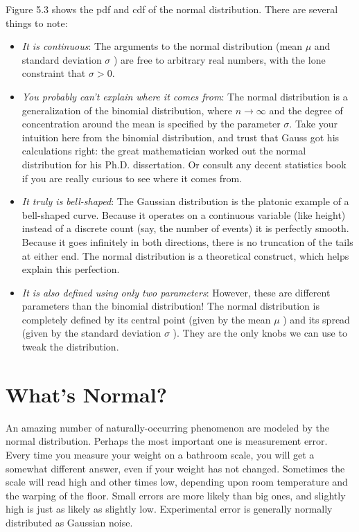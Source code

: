 \documentclass[10pt]{article}
\begin{document}
Figure 5.3 shows the pdf and cdf of the normal distribution. There are several things to note:
\begin{itemize}
  \item \emph{It is continuous}: The arguments to the normal distribution (mean $\mu$ and standard deviation $\sigma$ ) are free to arbitrary real numbers, with the lone constraint that $\sigma>0$.
  \item \emph{You probably can't explain where it comes from}: The normal distribution is a generalization of the binomial distribution, where $n \rightarrow \infty$ and the degree of concentration around the mean is specified by the parameter $\sigma$. Take your intuition here from the binomial distribution, and trust that Gauss got his calculations right: the great mathematician worked out the normal distribution for his Ph.D. dissertation. Or consult any decent statistics book if you are really curious to see where it comes from.
  \item \emph{It truly is bell-shaped}: The Gaussian distribution is the platonic example of a bell-shaped curve. Because it operates on a continuous variable (like height) instead of a discrete count (say, the number of events) it is perfectly smooth. Because it goes infinitely in both directions, there is no truncation of the tails at either end. The normal distribution is a theoretical construct, which helps explain this perfection.
  \item \emph{It is also defined using only two parameters}: However, these are different parameters than the binomial distribution! The normal distribution is completely defined by its central point (given by the mean $\mu$ ) and its spread (given by the standard deviation $\sigma$ ). They are the only knobs we can use to tweak the distribution.
\end{itemize}

\section*{What's Normal?}
An amazing number of naturally-occurring phenomenon are modeled by the normal distribution. Perhaps the most important one is measurement error. Every time you measure your weight on a bathroom scale, you will get a somewhat different answer, even if your weight has not changed. Sometimes the scale will read high and other times low, depending upon room temperature and the warping of the floor. Small errors are more likely than big ones, and slightly high is just as likely as slightly low. Experimental error is generally normally distributed as Gaussian noise.
\end{document}
